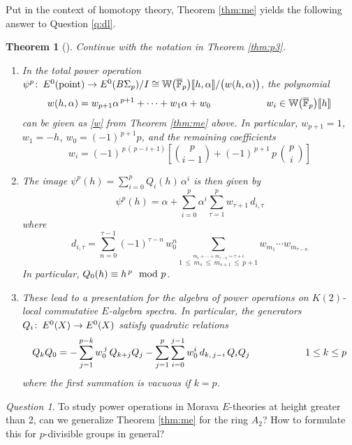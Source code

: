 \documentclass{rs}
\newtheorem{thm}[equation]{Theorem}
\theoremstyle{definition}
\theoremstyle{remark}
\newtheorem{ques}[equation]{Question}
\def\co{\colon\thinspace}
\newcommand{\mb}[1]{\mathbb{#1}}
\newcommand{\cF}{\overline {\mb F}}
\newcommand{\BW}{{\mb W}}
\newcommand{\md}{~~{\rm mod}~}
\newcommand{\pt}{{\rm point}}
\newcommand{\A}{\alpha}
\newcommand{\T}{\tau}
\newcommand{\lb}{\llbracket}
\newcommand{\rb}{\rrbracket}
\renewcommand{\=}{\approx}
\renewcommand{\-}{\sim}
\renewcommand{\c}[2]{{#1 \choose #2}}
\numberwithin{equation}{section}
\begin{document}
Put in the context of homotopy theory, Theorem \ref{thm:me} yields the following 
answer to Question \ref{q:dl}.  

\begin{thm}[{\cite[Theorems 1.6 and 1.7]{me}}]
 \label{cor}
 Continue with the notation in Theorem \ref{thm:p3}.  

 \begin{enumerate}[{\em (i)}]
  \item In the total power operation $\psi^p \co E^0(\pt) \to E^0(B\Sigma_p) / I 
  \cong \BW\big(\cF_p\big)\lb h,\A \rb / \big( w(h,\A) \big)$, the polynomial 
  \[
   w(h,\A) = w_{p + 1} \A^{\,p + 1} + \cdots + w_1 \A + w_0 
   \hskip 2cm w_i \in \BW\big(\cF_p\big)\lb h \rb 
  \]
  can be given as \eqref{w} from Theorem \ref{thm:me} above.  In particular, 
  $w_{p + 1} = 1$, $w_1 = -h$, $w_0 = (-1)^{\,p + 1} p$, and the remaining 
  coefficients 
  \[
   w_i = (-1)^{\,p\,(\,p - i + 1)} \left[ \c{p}{i - 1} + (-1)^{\,p + 1} \, p \, 
         \c{\,p\,}{i} \right] 
  \]

  \item The image $\psi^p(h) = \sum_{i = 0}^p Q_i(h) \, \A^i$ is then given by 
  \[
   \psi^p(h) = \A + \sum_{i = 0}^p \A^i \sum_{\T = 1}^p w_{\T + 1} \, d_{i,\T} 
  \]
  where 
  \[
   d_{i,\T} = \sum_{n = 0}^{\T - 1} (-1)^{\T - n} \, w_0^n 
              \sum_{\stackrel{\scriptstyle m_1 + \cdots + m_{\T - n} = \T + i} 
              {1 \,\leq\, m_s \,\leq\, m_{s + 1} \,\leq\, p + 1}} w_{m_1} \cdots 
              w_{m_{\T - n}} 
  \]
  In particular, $Q_0(h) \equiv h^{\,p} \md p$.  

  \item These lead to a presentation for the algebra of power operations on 
  $K(2)$-local commutative $E$-algebra spectra.  In particular, the generators 
  $Q_i \co E^0(X) \to E^0(X)$ satisfy quadratic relations 
  \[
   Q_k Q_0 = -\sum_{j = 1}^{p - k} w_0^{\,j} \, Q_{k + j} Q_j - \sum_{j = 1}^p 
             \sum_{i = 0}^{j - 1} w_0^i \, d_{k,\,j - i} \, Q_i Q_j 
   \hskip 2cm 1 \leq k \leq p 
  \]
  where the first summation is vacuous if $k = p$.  
 \end{enumerate}
\end{thm}

\begin{ques}
 To study power operations in Morava $E$-theories at height greater than 2, can 
 we generalize Theorem \ref{thm:me} for the ring $A_2$?  How to formulate this 
 for $p$-divisible groups in general?  
\end{ques}
\end{document}

